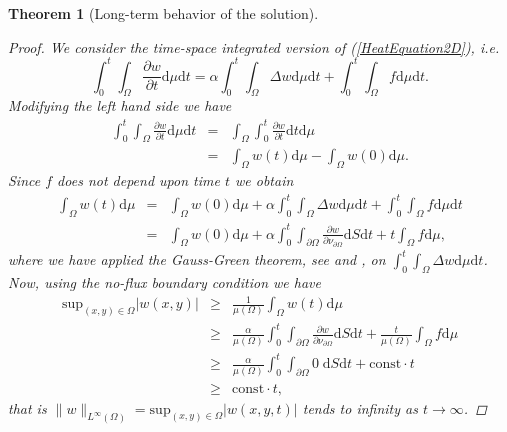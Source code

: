 \documentclass[a4paper,11pt]{article}
\theoremstyle{plain} %
\newtheorem{theorem}{Theorem}[section]
\theoremstyle{definition} %
\theoremstyle{remark} %
\def\uTemp{u}
\def\uTemp{w}
\def\volMeas{\mu}
\def\surfMeas{S}
\begin{document}
\begin{theorem}[Long-term behavior of the solution]
\begin{proof}
We consider the time-space integrated version of (\ref{HeatEquation2D}), i.e.
\begin{equation*}
\int_0^t \int_\Omega \frac{\partial \uTemp}{\partial t} \mathrm{d}\volMeas \mathrm{d}t = \alpha \int_0^t \int_\Omega \Delta\uTemp \mathrm{d}\volMeas \mathrm{d}t + \int_0^t \int_\Omega f \mathrm{d}\volMeas \mathrm{d}t .
\end{equation*}
Modifying the left hand side we have
\begin{eqnarray*}
\int_0^t \int_\Omega \frac{\partial \uTemp}{\partial t} \mathrm{d}\volMeas \mathrm{d}t & = &  \int_\Omega \int_0^t \frac{\partial \uTemp}{\partial t} \mathrm{d}t \mathrm{d}\volMeas \\
& = & \int_\Omega \uTemp (t) \mathrm{d}\volMeas - \int_\Omega \uTemp (0) \mathrm{d}\volMeas .
\end{eqnarray*}
Since $f$ does not depend upon time $t$ we obtain
\begin{eqnarray*}
\int_\Omega \uTemp (t) \mathrm{d}\volMeas & = & \int_\Omega \uTemp (0) \mathrm{d}\volMeas + \alpha \int_0^t \int_\Omega \Delta\uTemp \mathrm{d}\volMeas \mathrm{d}t + \int_0^t \int_\Omega f \mathrm{d}\volMeas \mathrm{d}t \\
& = & \int_\Omega \uTemp (0) \mathrm{d}\volMeas + \alpha \int_0^t \int_{\partial \Omega } \frac{\partial \uTemp}{\partial \nu_{\partial\Omega} } \mathrm{d}\surfMeas \mathrm{d}t + t \int_\Omega f \mathrm{d}\volMeas ,
\end{eqnarray*}
where we have applied the Gauss-Green theorem, see \cite[p. 288]{rudin1976} and \cite[p.312]{browder2001}, on $ \int_0^t \int_\Omega \Delta\uTemp \mathrm{d}\volMeas \mathrm{d}t $. Now, using the no-flux boundary condition we have
\begin{eqnarray*}
\mathrm{sup}_{(x,y) \in \Omega } |\uTemp(x,y) | & \geq & \frac{1}{\volMeas (\Omega )} 
\int_\Omega \uTemp (t) \mathrm{d}\volMeas \\
& \geq & \frac{\alpha}{\volMeas (\Omega )} \int_0^t \int_{\partial \Omega } \frac{\partial \uTemp}{\partial \nu_{\partial\Omega} } \mathrm{d}\surfMeas \mathrm{d}t + \frac{t}{\volMeas (\Omega )}  \int_\Omega f \mathrm{d}\volMeas \\
& \geq & \frac{\alpha}{\volMeas (\Omega )} \int_0^t \int_{\partial \Omega } 0\; \mathrm{d}\surfMeas \mathrm{d}t + \mathrm{const } \cdot t \\
& \geq &  \mathrm{const } \cdot t ,
\end{eqnarray*}
that is $ \| \uTemp \|_{L^\infty (\Omega )} =  \mathrm{sup}_{(x,y) \in \Omega } |\uTemp(x,y, t) | $ tends to infinity as $ t\rightarrow \infty $.
\end{proof}



\end{theorem}
\end{document}
